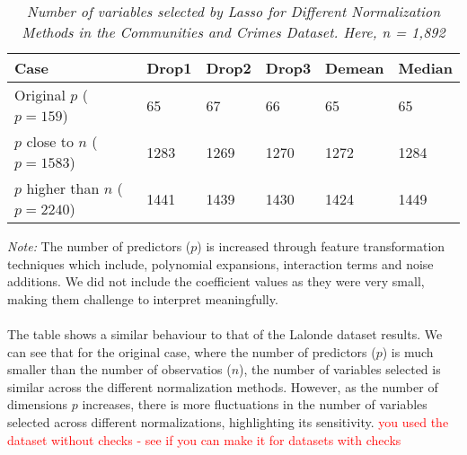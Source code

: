 \begin{table}[h!]
\renewcommand{\arraystretch}{1.5}
\centering
\begin{tabular}{||l l l l l l||} 
 \hline
 \hline
 Case & Drop1 & Drop2 & Drop3 & Demean & Median \\ [0.5ex] 
 \hline\hline 
 Original $p$ ($p = 159$) & 65 & 67 & 66 & 65 & 65 \\ 
 $p$ close to $n$ ($p = 1583$) & 1283 & 1269 & 1270 & 1272 & 1284 \\
 $p$ higher than $n$ ($p= 2240$) & 1441 & 1439 & 1430 & 1424 & 1449 \\ [1ex] 
 \hline
\end{tabular}
\caption{\textit{Number of variables selected by Lasso for Different Normalization Methods in the Communities and Crimes Dataset. Here, n = 1,892 }}
\label{table:1}
\end{table}

\textit{Note:} The number of predictors ($p$) is increased through feature transformation techniques which include, polynomial expansions, interaction terms and noise additions. We did not include the coefficient values as they were very small, making them challenge to interpret meaningfully. \\
\\
The table shows a similar behaviour to that of the Lalonde dataset results. We can see that for the original case, where the number of predictors ($p$) is much smaller than the number of observatios ($n$), the number of variables selected is similar across the different normalization methods. However, as the number of dimensions $p$ increases, there is more fluctuations in the number of variables selected across different normalizations, highlighting its sensitivity. 
\textcolor{red}{you used the dataset without checks - see if you can make it for datasets with checks}




